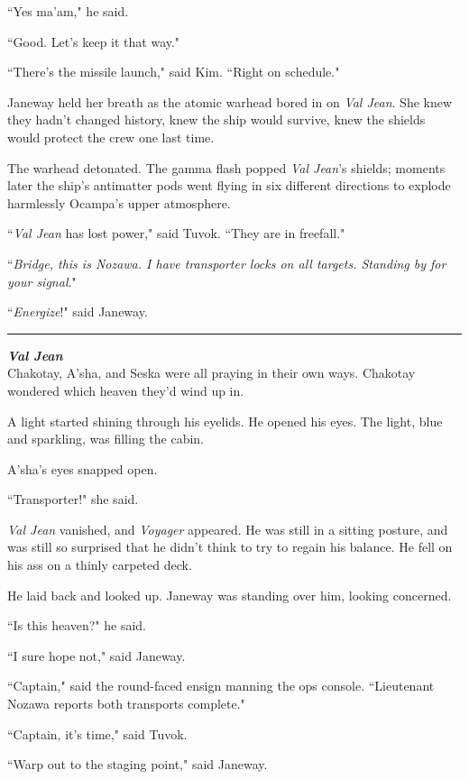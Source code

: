 \documentclass[twoside,letterpaper,12pt]{memoir}
\begin{document}
``Yes ma'am," he said. 

``Good. Let's keep it that way." 

``There's the missile launch," said Kim. ``Right on schedule." 

Janeway held her breath as the atomic warhead bored in on \textit{Val Jean}. She knew they hadn't changed history, knew the ship would survive, knew the shields would protect the crew one last time. 

The warhead detonated. The gamma flash popped \textit{Val Jean}'s shields; moments later the ship's antimatter pods went flying in six different directions to explode harmlessly Ocampa's upper atmosphere. 

``\textit{Val Jean} has lost power," said Tuvok. ``They are in freefall." 

``\textit{Bridge, this is Nozawa. I have transporter locks on all targets. Standing by for your signal}." 

``\textit{Energize}!" said Janeway. 

\begin{center}\rule{3cm}{0.4 pt}\end{center} 

\noindent\textit{\textbf{Val Jean}}\\

Chakotay, A'sha, and Seska were all praying in their own ways. Chakotay wondered which heaven they'd wind up in. 

A light started shining through his eyelids. He opened his eyes. The light, blue and sparkling, was filling the cabin. 

A'sha's eyes snapped open. 

``Transporter!" she said. 

\textit{Val Jean} vanished, and \textit{Voyager} appeared. He was still in a sitting posture, and was still so surprised that he didn't think to try to regain his balance. He fell on his ass on a thinly carpeted deck. 

He laid back and looked up. Janeway was standing over him, looking concerned. 

``Is this heaven?" he said. 

``I sure hope not," said Janeway. 

``Captain," said the round-faced ensign manning the ops console. ``Lieutenant Nozawa reports both transports complete." 

``Captain, it's time," said Tuvok. 

``Warp out to the staging point," said Janeway. 
\end{document}
